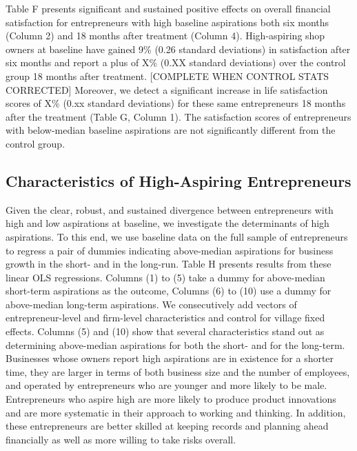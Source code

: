 \documentclass[11.5pt]{article}
\begin{document}
Table F presents significant and sustained positive effects on overall financial satisfaction for entrepreneurs with high baseline aspirations both six months (Column 2) and 18 months after treatment (Column 4). High-aspiring shop owners at baseline have gained 9\% (0.26 standard deviations) in satisfaction after six months and report a plus of X\% (0.XX standard deviations) over the control group 18 months after treatment. [COMPLETE WHEN CONTROL STATS CORRECTED] Moreover, we detect a significant increase in life satisfaction scores of X\% (0.xx standard deviations) for these same entrepreneurs 18 months after the treatment (Table G, Column 1). The satisfaction scores of entrepreneurs with below-median baseline aspirations are not significantly different from the control group.

\subsection{Characteristics of High-Aspiring Entrepreneurs}

Given the clear, robust, and sustained divergence between entrepreneurs with high and low aspirations at baseline, we investigate the determinants of high aspirations. To this end, we use baseline data on the full sample of entrepreneurs to regress a pair of dummies indicating above-median aspirations for business growth in the short- and in the long-run. Table H presents results from these linear OLS regressions. Columns (1) to (5) take a dummy for above-median short-term aspirations as the outcome, Columns (6) to (10) use a dummy for above-median long-term aspirations. We consecutively add vectors of entrepreneur-level and firm-level characteristics and control for village fixed effects. Columns (5) and (10) show that several characteristics stand out as determining above-median aspirations for both the short- and for the long-term. Businesses whose owners report high aspirations are in existence for a shorter time, they are larger in terms of both business size and the number of employees, and operated by entrepreneurs who are younger and more likely to be male. Entrepreneurs who aspire high are more likely to produce product innovations and are more systematic in their approach to working and thinking. In addition, these entrepreneurs are better skilled at keeping records and planning ahead financially as well as more willing to take risks overall.

\end{document}
